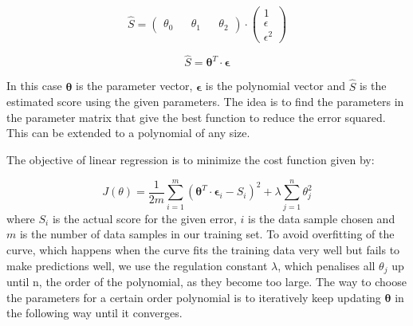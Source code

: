\documentclass[10pt,a4paper]{article}
\begin{document}
\begin{equation}
\hat{S} = \begin{pmatrix}
  \theta_0 &&
  \theta_1 &&
  \theta_2
 \end{pmatrix}
 \cdot
 \begin{pmatrix}
   1 \\
   \epsilon\\
   \epsilon^2
 \end{pmatrix}
\end{equation} 

\begin{equation}
\hat{S} = \boldsymbol \theta^T \cdot \boldsymbol \epsilon
\end{equation} 


\noindent
In this case $\boldsymbol \theta$ is the parameter vector, $\boldsymbol \epsilon$ is the polynomial vector and $\hat{S} $ is the estimated score using the given parameters. The idea is to find the parameters in the parameter matrix that give the best function to reduce the error squared. This can be extended to a polynomial of any size.
 
\noindent
The objective of linear regression is to minimize the cost function given by:

\begin{equation}
J(\theta) = \frac{1}{2m} \sum_{i=1}^m \left( \boldsymbol \theta^T \cdot \boldsymbol \epsilon_i - S_i\right)^2  + \lambda \sum_{j=1}^n \theta_j^2
\end{equation} 
where $S_i$ is the actual score for the given error, $i$ is the data sample chosen and $m$ is the number of data samples in our training set. To avoid overfitting of the curve, which happens when the curve fits the training data very well but fails to make predictions well, we use the regulation constant $\lambda$, which penalises all $\theta_j$ up until n, the order of the polynomial, as they become too large. The way to choose the parameters for a certain order polynomial is to iteratively keep updating $\boldsymbol \theta$ in the following way until it converges.
\end{document}
